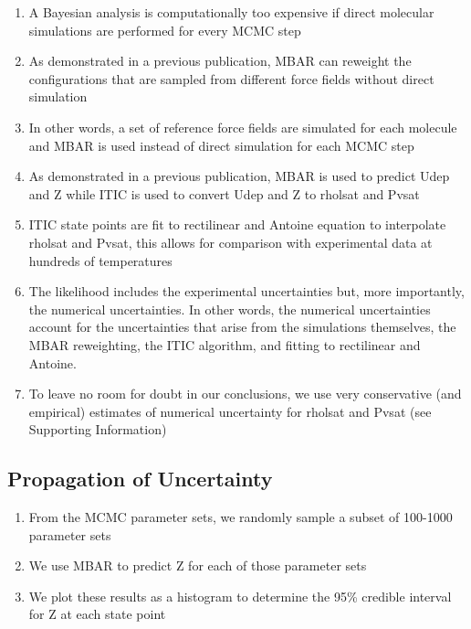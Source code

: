 \documentclass[journal=jctc,manuscript=article]{achemso}
\begin{document}
\begin{enumerate}
	\item A Bayesian analysis is computationally too expensive if direct molecular simulations are performed for every MCMC step
	\item As demonstrated in a previous publication, MBAR can reweight the configurations that are sampled from different force fields without direct simulation
	\item In other words, a set of reference force fields are simulated for each molecule and MBAR is used instead of direct simulation for each MCMC step
	\item As demonstrated in a previous publication, MBAR is used to predict Udep and Z while ITIC is used to convert Udep and Z to rholsat and Pvsat
	\item ITIC state points are fit to rectilinear and Antoine equation to interpolate rholsat and Pvsat, this allows for comparison with experimental data at hundreds of temperatures
	\item The likelihood includes the experimental uncertainties but, more importantly, the numerical uncertainties. In other words, the numerical uncertainties account for the uncertainties that arise from the simulations themselves, the MBAR reweighting, the ITIC algorithm, and fitting to rectilinear and Antoine.
	\item To leave no room for doubt in our conclusions, we use very conservative (and empirical) estimates of numerical uncertainty for rholsat and Pvsat (see Supporting Information)
\end{enumerate}

\subsection{Propagation of Uncertainty}
\begin{enumerate}
	\item From the MCMC parameter sets, we randomly sample a subset of 100-1000 parameter sets
	\item We use MBAR to predict Z for each of those parameter sets
	\item We plot these results as a histogram to determine the 95\% credible interval for Z at each state point
\end{enumerate}
\end{document}
